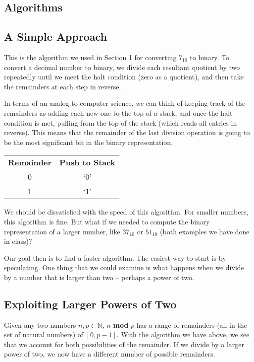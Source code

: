\documentclass[12pt]{article}
\begin{document}
\newpage %



\begin{center}
  \section{Algorithms}
\end{center}
\subsection{A Simple Approach}
This is the algorithm we used in Section 1 for converting $7_{10}$ to binary.  To convert a decimal number to binary, we divide each resultant quotient by two repeatedly until we meet the halt condition (zero as a quotient), and then take the remainders at each step in reverse.

\par In terms of an analog to computer science, we can think of keeping track of the remainders as adding each new one to the top of a stack, and once the halt condition is met, pulling from the top of the stack (which reads all entries in reverse). This means that the remainder of the last division operation is going to be the most significant bit in the binary representation.

\begin{center}
  \begin{tabular}{c|c}
    \textbf{Remainder} & \textbf{Push to Stack} \\
    0 & `0' \\
    1 & `1'
  \end{tabular}
\end{center}

\par We should be dissatisfied with the speed of this algorithm. For smaller numbers, this algorithm is fine. But what if we needed to compute the binary representation of a larger number, like $37_{10}$ or $51_{10}$ (both examples we have done in class)?

\par Our goal then is to find a faster algorithm. The easiest way to start is by speculating. One thing that we could examine is what happens when we divide by a number that is larger than two -- perhaps a power of two.

\subsection{Exploiting Larger Powers of Two}
Given any two numbers $n,p\in\mathbb{N}$, $n$ \textbf{mod} $p$ has a range of remainders (all in the set of natural numbers) of $[0,p-1]$. With the algorithm we have above, we see that we account for both possibilities of the remainder. If we divide by a larger power of two, we now have a different number of possible remainders.
\end{document}
